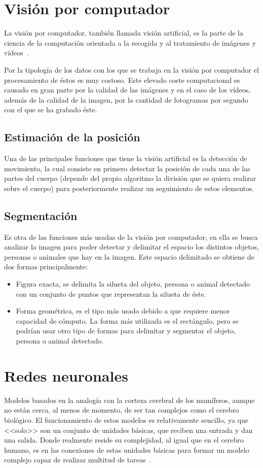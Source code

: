 \section{Visión por computador}
La visión por computador, también llamada visión artificial, es la parte de la ciencia de la computación orientada a la recogida y al tratamiento de imágenes y vídeos~\cite{wiki:visionartifical,cnn}.

Por la tipología de los datos con los que se trabaja en la visión por computador el procesamiento de éstos es muy costoso. Este elevado coste computacional es causado en gran parte por la calidad de las imágenes y en el caso de los vídeos, además de la calidad de la imagen, por la cantidad de fotogramas por segundo con el que se ha grabado éste.

\subsection{Estimación de la posición}
Una de las principales funciones que tiene la visión artificial es la detección de movimiento, la cual consiste en primero detectar la posición de cada una de las partes del cuerpo (depende del propio algoritmo la división que se quiera realizar sobre el cuerpo) para posteriormente realizar un seguimiento de estos elementos.

\subsection{Segmentación}
Es otra de las funciones más usadas de la visión por computador, en ella se busca analizar la imagen para poder detectar y delimitar el espacio los distintos objetos, personas o animales que hay en la imagen. Este espacio delimitado se obtiene de dos formas principalmente:
\begin{itemize}
	\item Figura exacta, se delimita la silueta del objeto, persona o animal detectado con un conjunto de puntos que representan la silueta de éste.
	\item Forma geométrica, es el tipo más usado debido a que requiere menor capacidad de cómputo. La forma más utilizada es el rectángulo, pero se podrían usar otro tipo de formas para delimitar y segmentar el objeto, persona o animal detectado.
\end{itemize}

\section{Redes neuronales}
Modelos basados en la analogía con la corteza cerebral de los mamíferos, aunque no están cerca, al menos de momento, de ser tan complejos como el cerebro biológico. El funcionamiento de estos modelos es relativamente sencillo, ya que <<solo>> son un conjunto de unidades básicas, que reciben una entrada y dan una salida. Donde realmente reside su complejidad, al igual que en el cerebro humano, es en las conexiones de estas unidades básicas para formar un modelo complejo capaz de realizar multitud de tareas~\cite{cnn}.

